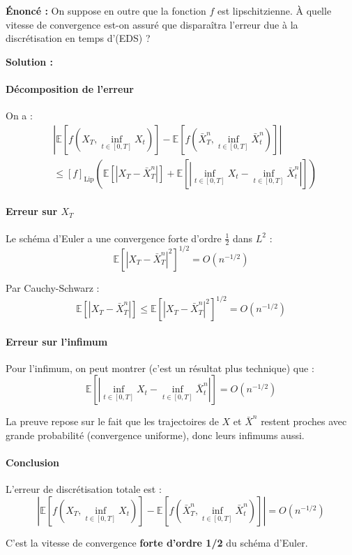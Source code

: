 \documentclass[12pt,a4paper]{article}
\theoremstyle{definition}
\theoremstyle{remark}
\newcommand{\E}{\mathbb{E}}
\begin{document}
\textbf{Énoncé :} On suppose en outre que la fonction $f$ est lipschitzienne. À quelle vitesse de convergence est-on assuré que disparaîtra l'erreur due à la discrétisation en temps d'(EDS) ?

\textbf{Solution :}

\paragraph{Décomposition de l'erreur}

On a :
\begin{align*}
&|\E[f(X_T, \inf_{t \in [0,T]} X_t)] - \E[f(\bar{X}_T^n, \inf_{t \in [0,T]} \bar{X}_t^n)]| \\
&\leq [f]_{\text{Lip}} \left(\E[|X_T - \bar{X}_T^n|] + \E\left[\left|\inf_{t \in [0,T]} X_t - \inf_{t \in [0,T]} \bar{X}_t^n\right|\right]\right)
\end{align*}

\paragraph{Erreur sur $X_T$}

Le schéma d'Euler a une convergence forte d'ordre $\frac{1}{2}$ dans $L^2$ :
\[
\E[|X_T - \bar{X}_T^n|^2]^{1/2} = O(n^{-1/2})
\]

Par Cauchy-Schwarz :
\[
\E[|X_T - \bar{X}_T^n|] \leq \E[|X_T - \bar{X}_T^n|^2]^{1/2} = O(n^{-1/2})
\]

\paragraph{Erreur sur l'infimum}

Pour l'infimum, on peut montrer (c'est un résultat plus technique) que :
\[
\E\left[\left|\inf_{t \in [0,T]} X_t - \inf_{t \in [0,T]} \bar{X}_t^n\right|\right] = O(n^{-1/2})
\]

La preuve repose sur le fait que les trajectoires de $X$ et $\bar{X}^n$ restent proches avec grande probabilité (convergence uniforme), donc leurs infimums aussi.

\paragraph{Conclusion}

L'erreur de discrétisation totale est :
\[
\boxed{|\E[f(X_T, \inf_{t \in [0,T]} X_t)] - \E[f(\bar{X}_T^n, \inf_{t \in [0,T]} \bar{X}_t^n)]| = O(n^{-1/2})}
\]

C'est la vitesse de convergence \textbf{forte d'ordre 1/2} du schéma d'Euler.
\end{document}
